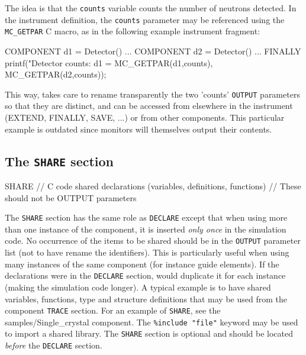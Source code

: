 The idea is that the \texttt{counts} variable counts the number of neutrons detected. In
the instrument definition, the \texttt{counts} parameter may be referenced using
the \verb+MC_GETPAR+ C macro, as in the following example instrument
fragment:\label{mcgetpar}

\begin{mcstas}
COMPONENT d1 = Detector()
...
COMPONENT d2 = Detector()
...
FINALLY
  printf("Detector counts: d1 = %
         MC_GETPAR(d1,counts), MC_GETPAR(d2,counts));
\end{mcstas}

This way, \MCS takes care to rename transparently the two 'counts'
\texttt{OUTPUT} parameters so that they are distinct, and can be accessed from
elsewhere in the instrument (EXTEND, FINALLY, SAVE, ...)  or from other
components. This particular example is outdated since \MCS monitors will
themselves output their contents.

\subsection{The \texttt{SHARE} section}
\label{s:comp-share}
\begin{mcstas}
SHARE
// C code shared declarations (variables, definitions, functions)
// These should not be OUTPUT parameters
\end{mcstas}


The \texttt{SHARE} section has the same role as \texttt{DECLARE} except that
when using more than one instance of the component, it is inserted \emph{only
  once} in the simulation code. No occurrence of the items to be shared should be
in the \texttt{OUTPUT} parameter list (not to have \MCS rename the
identifiers).  This is particularly useful when using many instances of the same
component (for instance guide elements). If the declarations were in the
\texttt{DECLARE} section, \MCS would duplicate it for each instance (making the
simulation code longer).  A typical example is to have shared variables,
functions, type and structure definitions that may be used from the component
\texttt{TRACE} section. For an example of \texttt{SHARE}, see the
samples/Single\_crystal component. The \verb+%include "file"+ keyword may be
used to import
a shared library. The \texttt{SHARE} section is optional and should be located {\it before} the \texttt{DECLARE} section.

